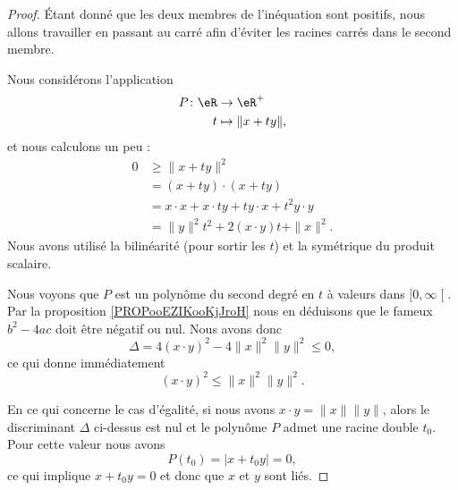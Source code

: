 \begin{proof}
    Étant donné que les deux membres de l'inéquation sont positifs, nous allons travailler en passant au carré afin d'éviter les racines carrés dans le second membre.

    Nous considérons l'application
    \begin{equation}
        \begin{aligned}
            P\colon \eR&\to \eR^+ \\
            t&\mapsto \| x+ty \|, 
        \end{aligned}
    \end{equation}
    et nous calculons un peu :
    \begin{subequations}
        \begin{align}
        0&\geq \| x+ty \|^2\\
        &=(x+ty)\cdot(x+ty)\\
        &=x\cdot x+x\cdot ty+ty\cdot x+t^2y\cdot y\\
        &=\| y \|^2t^2+2(x\cdot y)t+\| x \|^2.
        \end{align}
    \end{subequations}
    Nous avons utilisé la bilinéarité (pour sortir les \( t\)) et la symétrique du produit scalaire.

    Nous voyons que \( P\) est un polynôme du second degré en \( t\) à valeurs dans \( \mathopen[ 0 , \infty \mathclose[\). Par la proposition \ref{PROPooEZIKooKjJroH} nous en déduisons que le fameux \( b^2-4ac\) doit être négatif ou nul. Nous avons donc
    \begin{equation}
        \Delta=4(x\cdot y)^2-4\| x \|^2\| y \|^2\leq 0,
    \end{equation}
    ce qui donne immédiatement
    \begin{equation}
        (x\cdot y)^2\leq\| x \|^2\| y \|^2.
    \end{equation}

    En ce qui concerne le cas d'égalité, si nous avons \( x\cdot y=\| x \|\| y \|\), alors le discriminant \( \Delta\) ci-dessus est nul et le polynôme \( P\) admet une racine double \( t_0\). Pour cette valeur nous avons
    \begin{equation}
        P(t_0)=| x+t_0y |=0,
    \end{equation}
    ce qui implique \( x+t_0y=0\) et donc que \( x\) et \( y\) sont liés.
\end{proof}

